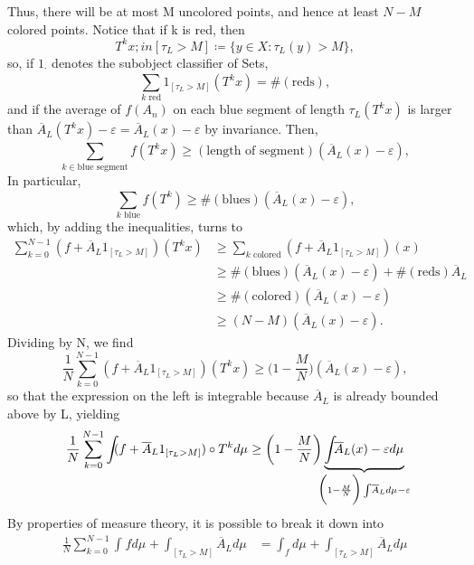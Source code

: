 \documentclass[../fractals_everywhere.tex]{subfiles}
\begin{document}
\begin{proof*}
	Thus, there will be at most M uncolored points, and hence at least \(N-M\) colored points. Notice that if k is red, then
	\[
		T^{k}x;in [\tau_{L} > M]\coloneqq \{y\in X: \tau_{L}(y) > M\},
	\]
	so, if \(1_{\cdot }\) denotes the subobject classifier of Sets,
	\[
		\sum\limits_{k \text{ red}}^{} 1_{[\tau_{L}>M]}(T^{k}x) = \#(\text{reds}),
	\]
	and if the average of \(f(A_{n})\) on each blue segment of length \(\tau_{L}(T^{k}x)\) is larger than \(\overline{A}_{L}(T^{k}x)-\varepsilon = \overline{A}_{L}(x) - \varepsilon \) by invariance. Then,
	\[
		\sum\limits_{k\in \text{blue segment}}^{}f(T^{k}x) \geq (\text{length of segment})(\overline{A}_{L}(x)-\varepsilon ),
	\]
	In particular,
	\[
		\sum\limits_{k \text{ blue}}^{}f(T^{k})\geq \#(\text{blues})(\overline{A}_{L}(x) - \varepsilon ),
	\]
	which, by adding the inequalities, turns to
	\begin{align*}
		\sum\limits_{k=0}^{N-1}(f+\overline{A}_{L}1_{[\tau_{L}>M]})(T^{k}x) & \geq \sum\limits_{k \text{ colored}}^{} (f+\overline{A}_{L}1_{[\tau_{L}>M]})(x)          \\
		                                                                    & \geq \#(\text{blues}) (\overline{A}_{L}(x)-\varepsilon )+\#(\text{reds})\overline{A}_{L} \\
		                                                                    & \geq \#(\text{colored})(\overline{A}_{L}(x) - \varepsilon )                              \\
		                                                                    & \geq (N-M)(\overline{A}_{L}(x)-\varepsilon ).
	\end{align*}
	Dividing by N, we find
	\[
		\frac{1}{N}\sum\limits_{k=0}^{N-1}(f+\overline{A}_{L}1_{[\tau_{L}>M]})(T^{k}x)\geq \biggl(1-\frac{M}{N}\biggr)(\overline{A}_{L}(x)-\varepsilon ),
	\]
	so that the expression on the left is integrable because \(\overline{A}_{L}\) is already bounded above by L, yielding
	\[
		\frac{1}{N}\sum\limits_{k=0}^{N-1}\int_{}(f+\overline{A}_{L}1_{[\tau_{L}>M]})\circ T^{k} d\mu_{} \geq \biggl(1-\frac{M}{N}\biggr)\underbrace{\int_{}\overline{A}_{L}(x)-\varepsilon  d\mu_{}}_{\mathclap{\biggl(1-\frac{M}{N}\biggr)\int_{}\overline{A}_{L} d\mu_{} - \varepsilon}}
	\]
	By properties of measure theory, it is possible to break it down into
	\begin{align*}
		\frac{1}{N}\sum\limits_{k=0}^{N-1}\int_{}f d\mu_{}+\int_{[\tau_{L}>M]}\overline{A}_{L} d\mu_{} & = \int_{f} d\mu_{} + \int_{[\tau_{L}>M]}\overline{A}_{L} d\mu_{}                                                     \\

\end{align*}
\end{proof*}
\end{document}
